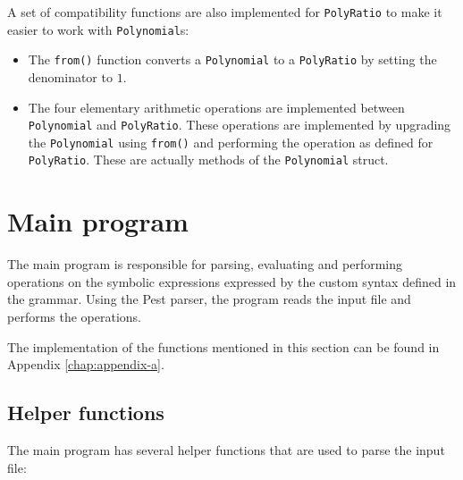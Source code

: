 

A set of compatibility functions are also implemented for \verb|PolyRatio| to make it easier to work with \verb|Polynomial|s:

\begin{itemize}
    \item The \verb|from()| function converts a \verb|Polynomial| to a \verb|PolyRatio| by setting the denominator to $1$.
    \item The four elementary arithmetic operations are implemented between \verb|Polynomial| and \verb|PolyRatio|. These operations are implemented by upgrading the \verb|Polynomial| using \verb|from()| and performing the operation as defined for \verb|PolyRatio|. These are actually methods of the \verb|Polynomial| struct.
\end{itemize}



\section{Main program}\label{sec:main-program}

The main program is responsible for parsing, evaluating and performing operations on the symbolic expressions expressed by the custom syntax defined in the grammar. Using the Pest parser, the program reads the input file and performs the operations.

The implementation of the functions mentioned in this section can be found in Appendix \ref{chap:appendix-a}.

\subsection{Helper functions}\label{subsec:helper-functions}

The main program has several helper functions that are used to parse the input file:

